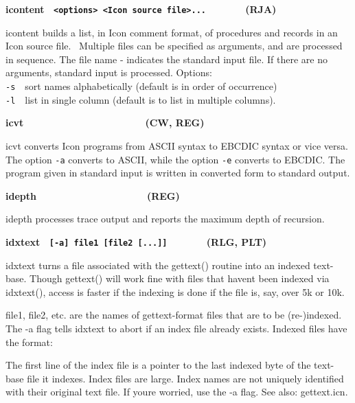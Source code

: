 {\sffamily\bfseries
icontent \ \texttt{\textmd{{\textless}options{\textgreater}
{\textless}Icon source file{\textgreater}...\ \ \ \ \ \ \ \ }}(RJA)}

\textsf{icontent} builds a list, in Icon comment format, of procedures
and records in an Icon source file. \ Multiple files can be specified
as arguments, and are processed in sequence. The file name
{\textquotedbl}-{\textquotedbl} indicates the standard input file. If
there are no arguments, standard input is processed. Options:\\
\texttt{{}-s}\ \ sort names alphabetically (default is in order of
occurrence)\\
\texttt{{}-l}\ \ list in single column (default is to list in multiple
columns).

{\sffamily\bfseries
icvt\ \ \ \ \ \ \ \ \ \ \ \ \ \ \ \ \ \ \ \  \ \ (CW, REG)}

\textsf{icvt} converts Icon programs from ASCII syntax to
EBCDIC syntax or vice versa. The option \texttt{{}-a}
converts to ASCII, while the option \texttt{{}-e} converts to EBCDIC.
The program given in standard input is written in converted form to
standard output. 

{\sffamily\bfseries
idepth\ \ \ \ \ \ \ \ \ \ \ \ \ \ \ \ \ \ \ \ (REG)}

\textsf{idepth} processes trace output and reports the maximum depth of
recursion. 

{\sffamily\bfseries
idxtext \ \texttt{\textmd{[-a] file1 [file2 [...]]\ \ \ \ \ \ \ \ 
}}(RLG, PLT)}

\textsf{idxtext} turns a file associated with the \textsf{gettext()}
routine into an indexed text-base. Though \textsf{gettext()} will work
fine with files that haven{\textquotesingle}t been indexed via
\textsf{idxtext()}, access is faster if the indexing is done if the
file is, say, over 5k or 10k.

\textsf{file1, file2}, etc. are the names of \textsf{gettext}{}-format
files that are to be (re-)indexed. The \textsf{{}-a} flag tells
\textsf{idxtext} to abort if an index file already exists. Indexed
files have the format:


The first line of the index file is a pointer to the last indexed byte
of the text-base file it indexes. Index files are large. Index names
are not uniquely identified with their original text file. If
you{\textquotesingle}re worried, use the \textsf{{}-a} flag. See also:
\textsf{gettext.icn}. 

